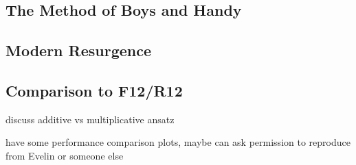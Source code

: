 
\subsection{The Method of Boys and Handy}

\subsection{Modern Resurgence}

\subsection{Comparison to F12/R12}

discuss additive vs multiplicative ansatz

have some performance comparison plots, maybe can ask permission to reproduce from Evelin or someone else
